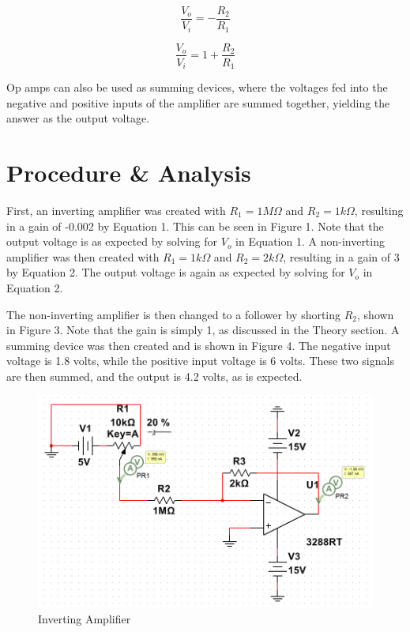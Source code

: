 \documentclass[12pt]{article}
\begin{document}
\begin{equation}
\frac{V_{o}}{V_{i}} = -\frac{R_{2}}{R_{1}}
\end{equation}
\bigskip

\begin{equation}
\frac{V_{o}}{V_{i}} = 1 + \frac{R_{2}}{R_{1}}
\end{equation}
\bigskip

Op amps can also be used as summing devices, where the voltages fed into the negative and positive inputs of the amplifier are summed together, yielding the answer as the output voltage.


\section*{\fontsize{12}{12}\selectfont \large Procedure \& Analysis}
First, an inverting amplifier was created with $R_{1}= 1M\Omega$ and $R_{2}= 1k\Omega$, resulting in a gain of -0.002 by Equation 1. This can be seen in Figure 1. Note that the output voltage is as expected by solving for $V_{o}$ in Equation 1. A non-inverting amplifier was then created with $R_{1} = 1k\Omega$ and $R_{2} = 2k\Omega$, resulting in a gain of 3 by Equation 2. The output voltage is again as expected by solving for $V_{o}$ in Equation 2. 
\bigskip

The non-inverting amplifier is then changed to a follower by shorting $R_{2}$, shown in Figure 3. Note that the gain is simply 1, as discussed in the Theory section. A summing device was then created and is shown in Figure 4. The negative input voltage is 1.8 volts, while the positive input voltage is 6 volts. These two signals are then summed, and the output is 4.2 volts, as is expected.

\newpage

\begin{figure}[h!] %
   \centering
   \includegraphics[width=5in]{inverting.PNG} 
   \caption{Inverting Amplifier}
   \label{fig:example}
\end{figure}
\end{document}
